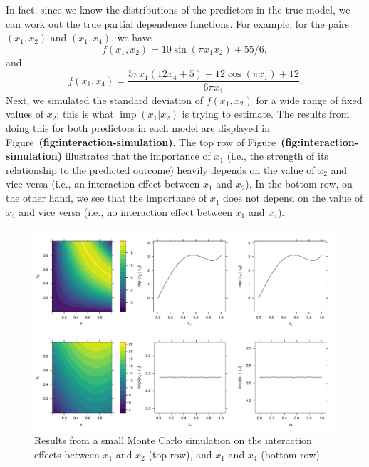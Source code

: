 \documentclass[12pt]{article}
\def\ref#1{\textbf{(#1)}}
\DeclareMathOperator{\imp}{imp}
\begin{document}
In fact, since we know the distributions of the predictors in the true model, we can work out the true partial dependence functions. For example, for the pairs $\left(x_1, x_2\right)$ and $\left(x_1, x_4\right)$, we have
\begin{equation*}
f\left(x_1, x_2\right) = 10 \sin \left(\pi x_1 x_2\right) + 55 / 6,
\end{equation*}
and 
\begin{equation*}
f\left(x_1, x_4\right) = \frac{5 \pi x_1 \left(12 x_4 + 5\right) - 12 \cos \left(\pi x_1\right) + 12}{6 \pi x_1}.
\end{equation*}
Next, we simulated the standard deviation of $f\left(x_1, x_2\right)$ for a wide range of fixed values of $x_2$; this is what $\imp\left(x_1 | x_2\right)$ is trying to estimate. The results from doing this for both predictors in each model are displayed in Figure~\ref{fig:interaction-simulation}. The top row of Figure~\ref{fig:interaction-simulation} illustrates that the importance of $x_1$ (i.e., the strength of its relationship to the predicted outcome) heavily depends on the value of $x_2$ and vice versa (i.e., an interaction effect between $x_1$ and $x_2$). In the bottom row, on the other hand, we see that the importance of $x_1$ does not depend on the value of $x_4$ and vice versa (i.e., no interaction effect between $x_1$ and $x_4$).

\begin{figure}[!htb]
  \centering
  \includegraphics[width=1\textwidth]{interaction-simulation}
  \caption{Results from a small Monte Carlo simulation on the interaction effects between $x_1$ and $x_2$ (top row), and $x_1$ and $x_4$ (bottom row). \label{fig:interaction-simulation}}
\end{figure}
\end{document}
